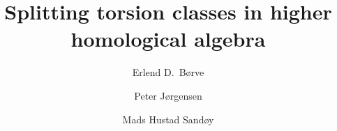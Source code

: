 \documentclass[12pt,reqno]{amsart}
\numberwithin{equation}{section}
\theoremstyle{definition}
\theoremstyle{theorem}
\theoremstyle{definition}
\begin{document}
\setlength{\parindent}{0pt}
\setlength{\parskip}{7pt}


\title[Splitting higher torsion classes]{Splitting torsion classes in higher homological algebra}


\author{Erlend D.\ B\o rve}

\address{Department of Mathematics, Aarhus University, Ny Munkegade 118, 8000 Aarhus C, Denmark}



\author{Peter J\o rgensen}

\address{Department of Mathematics, Aarhus University, Ny Munkegade 118, 8000 Aarhus C, Denmark}



\author{Mads Hustad Sand\o y}

\address{Department of Mathematics, Aarhus University, Ny Munkegade 118, 8000 Aarhus C, Denmark}





\end{document}
